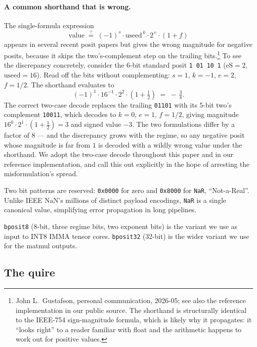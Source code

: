 \documentclass[11pt,a4paper]{article}
\newcommand{\bpeight}{\texttt{bposit8}}
\newcommand{\bpthirtytwo}{\texttt{bposit32}}
\newcommand{\NaR}{\texttt{NaR}}
\begin{document}
\paragraph{A common shorthand that is wrong.} The single-formula
expression
\[
    \mathrm{value} \;\stackrel{?}{=}\; (-1)^{s} \cdot \mathrm{useed}^{\,k}
    \cdot 2^{\,e} \cdot (1 + f)
\]
appears in several recent posit papers but gives the wrong magnitude
for negative posits, because it skips the two's-complement step on
the trailing bits.\footnote{John L.\ Gustafson, personal
communication, 2026-05; see also the reference implementation in our
public source. The shorthand is structurally identical to the
IEEE-754 sign-magnitude formula, which is likely why it propagates:
it ``looks right'' to a reader familiar with float and the
arithmetic happens to work out for positive values.} To see the
discrepancy concretely, consider the 6-bit standard posit
\texttt{1\,01\,10\,1} ($\mathrm{eS}{=}2$, $\mathrm{useed}{=}16$).
Read off the bits without complementing: $s{=}1$, $k{=}{-}1$,
$e{=}2$, $f{=}1/2$. The shorthand evaluates to
\[
    (-1)^{1} \cdot 16^{-1} \cdot 2^{2} \cdot (1 + \tfrac{1}{2})
    \;=\; -\,\tfrac{3}{8}.
\]
The correct two-case decode replaces the trailing \texttt{01101}
with its 5-bit two's complement \texttt{10011}, which decodes to
$k{=}0$, $e{=}1$, $f{=}1/2$, giving magnitude
$16^{0} \cdot 2^{1} \cdot (1 + \tfrac{1}{2}) = 3$ and signed value
$-3$. The two formulations differ by a factor of $8$ — and the
discrepancy grows with the regime, so any negative posit whose magnitude
is far from $1$ is decoded with a wildly wrong value under the
shorthand. We adopt the two-case decode throughout this paper and in
our reference implementation, and call this out explicitly in the
hope of arresting the misformulation's spread.

Two bit patterns are reserved: \texttt{0x0000} for zero and
\texttt{0x8000} for \NaR{}, ``Not-a-Real''. Unlike IEEE NaN's
millions of distinct payload encodings, \NaR{} is a single canonical
value, simplifying error propagation in long pipelines.

\bpeight{} (8-bit, three regime bits, two exponent bits) is the variant
we use as input to INT8 IMMA tensor cores. \bpthirtytwo{} (32-bit) is
the wider variant we use for the matmul outputs.

\subsection{The quire}
\end{document}

